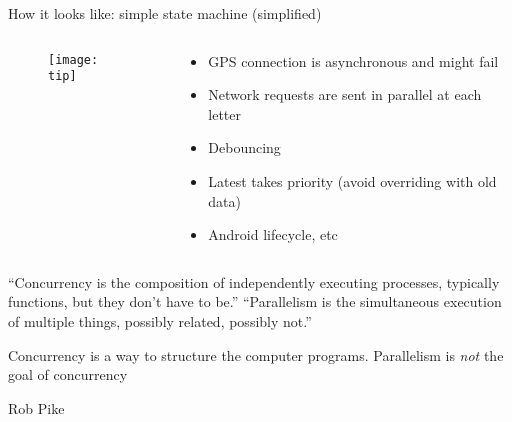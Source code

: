 \documentclass[10pt]{beamer}
\begin{document}
\begin{frame}[fragile]
	How it looks like: simple state machine  (simplified) 
	\begin{figure}
	\end{figure}

\end{frame}
\begin{frame}[fragile]
\begin{columns}
\begin{column}{0.5\textwidth}
	\begin{center}
	\begin{figure}
		\centering
		\texttt{[image: tip]}
	\end{figure}
	\end{center}
\end{column}
\begin{column}{0.6\textwidth}
	\begin{itemize}
		\item GPS connection is asynchronous and might fail
		\item Network requests are sent in parallel at each letter
		\item Debouncing 
		\item Latest takes priority (avoid overriding with old data) 
		\item Android lifecycle, etc
	\end{itemize}
\end{column}
\end{columns}

\end{frame}
\begin{frame}[fragile]
	``Concurrency is the composition of independently executing processes, typically functions, but they don't have to be.''
	``Parallelism is the simultaneous execution of multiple things, possibly related, possibly not.''

	Concurrency is a way to structure the computer programs. 
	Parallelism is \emph{not} the goal of concurrency

Rob Pike
\end{frame}
\end{document}
